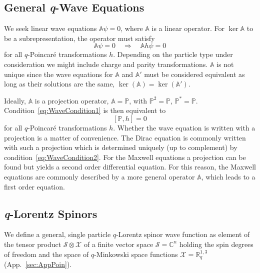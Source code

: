 \documentclass[12pt,a4paper]{article}
\newcommand{\Proj}{\mathbb{P}}
\newcommand{\Xcal}{\mathcal{X}}
\newcommand{\Scal}{\mathcal{S}}
\newcommand{\Mink}{{\mathbb{R}_q^{1,3}}}
\begin{document}
\subsection{General \textit{q}-Wave Equations}

We seek linear wave equations $\mathbb{A}\psi = 0$, where $\mathbb{A}$
is a linear operator. For $\ker \mathbb{A}$ to be a subrepresentation,
the operator must satisfy
\begin{equation}
\label{eq:WaveCondition1}
  \mathbb{A}\psi = 0 \quad\Rightarrow\quad \mathbb{A}h\psi = 0
\end{equation}
for all $q$-Poincar{\'e} transformations $h$. Depending on the particle
type under consideration we might include charge and parity
transformations. $\mathbb{A}$ is not unique since the wave
equations for $\mathbb{A}$ and $\mathbb{A}'$ must be considered
equivalent as long as their solutions are the same, $\ker(\mathbb{A})
= \ker(\mathbb{A}')$. 

Ideally, $\mathbb{A}$ is a projection operator, $\mathbb{A}=\Proj$,
with $\Proj^2=\Proj$, $\Proj^* = \Proj$.
Condition~\eqref{eq:WaveCondition1} is then equivalent to
\begin{equation}
\label{eq:WaveCondition2}
  [\Proj,h] = 0
\end{equation}
for all $q$-Poincar{\'e} transformations $h$. Whether the wave equation is
written with a projection is a matter of convenience. The Dirac
equation is commonly written with such a projection which is determined
uniquely (up to complement) by condition~\eqref{eq:WaveCondition2}.
For the Maxwell equations a projection can be found but yields a second
order differential equation. For this reason, the Maxwell equations
are commonly described by a more general operator $\mathbb{A}$, which
leads to a first order equation. 



\subsection{\textit{q}-Lorentz Spinors}

We define a general, single particle $q$-Lorentz spinor wave function
as element of the tensor product $\Scal\otimes \Xcal$ of a finite
vector space $\Scal = \mathbb{C}^n$ holding the spin degrees of
freedom and the space of $q$-Minkowski space functions $\Xcal = \Mink$
(App.~\ref{sec:AppPoin}).
\end{document}
